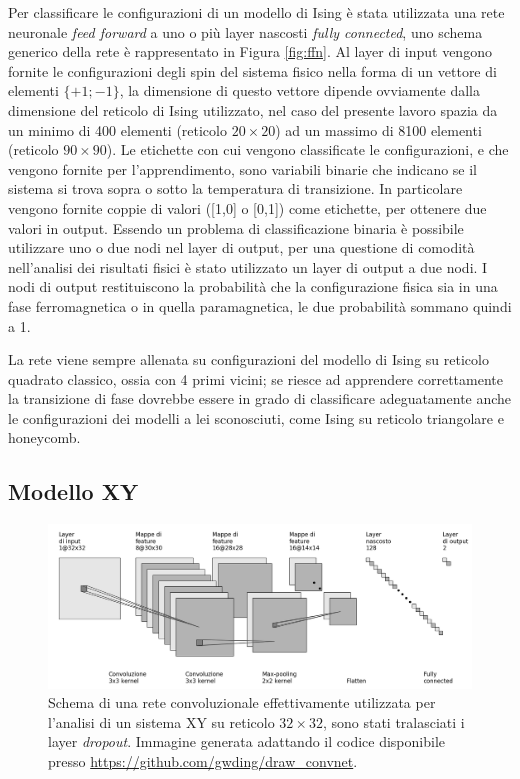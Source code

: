 \documentclass{article}
\begin{document}
Per classificare le configurazioni di un modello di Ising è stata utilizzata una rete neuronale \emph{feed forward} a uno o più layer nascosti \emph{fully connected}, uno schema generico della rete è rappresentato in Figura \ref{fig:ffn}.
Al layer di input vengono fornite le configurazioni degli spin del sistema fisico nella forma di un vettore di elementi $\{+1;-1\}$, la dimensione di questo vettore dipende ovviamente dalla dimensione del reticolo di Ising utilizzato, nel caso del presente lavoro spazia da un minimo di 400 elementi (reticolo $20\times20$) ad un massimo di 8100 elementi (reticolo $90\times90$).
Le etichette con cui vengono classificate le configurazioni, e che vengono fornite per l'apprendimento, sono variabili binarie che indicano se il sistema si trova sopra o sotto la temperatura di transizione.
In particolare vengono fornite coppie di valori ([1,0] o [0,1]) come etichette, per ottenere due valori in output.
Essendo un problema di classificazione binaria è possibile utilizzare uno o due nodi nel layer di output, per una questione di comodità nell'analisi dei risultati fisici è stato utilizzato un layer di output a due nodi.
I nodi di output restituiscono la probabilità che la configurazione fisica sia in una fase ferromagnetica o in quella paramagnetica, le due probabilità sommano quindi a 1.

La rete viene sempre allenata su configurazioni del modello di Ising su reticolo quadrato classico, ossia con 4 primi vicini; se riesce ad apprendere correttamente la transizione di fase dovrebbe essere in grado di classificare adeguatamente anche le configurazioni dei modelli a lei sconosciuti, come Ising su reticolo triangolare e honeycomb.

\subsection{Modello XY}
\label{sec:xy_learning}

\begin{figure}[ht]
 \centerline{\includegraphics[scale=0.35]{cnn.png}}
  \caption{Schema di una rete convoluzionale effettivamente utilizzata per l'analisi di un sistema XY su reticolo $32\times32$, sono stati tralasciati i layer \emph{dropout}. Immagine generata adattando il codice disponibile presso \url{https://github.com/gwding/draw_convnet}.}
 \label{fig:cnn}
\end{figure}
\end{document}
